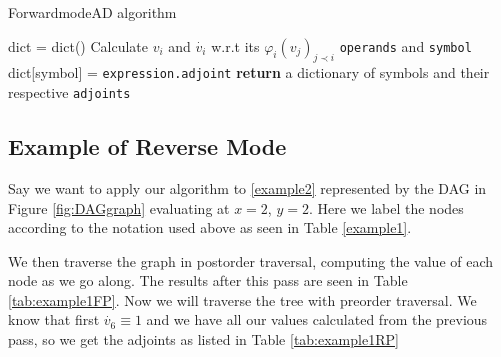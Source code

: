 \documentclass{article}
\begin{document}
\begin{algorithm}[h]
\caption{ForwardmodeAD algorithm}\label{forwardAD}
\begin{algorithmic}[1]
\State dict = dict()\Comment{}
    \State Calculate $v_i$ and $\Dot{v_i}$ w.r.t its $\varphi_i(v_j)_{j \prec i}$ \verb|operands| and \verb|symbol|
    \State dict[symbol] = \verb|expression.adjoint|
    \EndFor
\EndFor
\State \textbf{return} a dictionary of symbols and their respective \verb|adjoints|
\EndProcedure
\end{algorithmic}
\end{algorithm}

\subsection{Example of Reverse Mode}

Say we want to apply our algorithm to \eqref{example2} represented by the DAG in Figure \ref{fig:DAGgraph} evaluating at $x=2$, $y=2$. Here we label the nodes according to the notation used above as seen in Table \ref{example1}. 

We then traverse the graph in postorder traversal, computing the value of each node as we go along. The results after this pass are seen in Table \ref{tab:example1FP}. Now we will traverse the tree with preorder traversal. We know that first $\dot{v_6} \equiv 1$ and we have all our values calculated from the previous pass, so we get the adjoints as listed in Table \ref{tab:example1RP}
\end{document}
